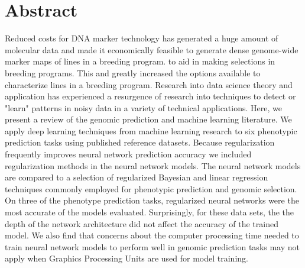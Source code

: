 \chapter*{Abstract}

Reduced costs for DNA marker technology has generated a huge amount of
molecular data and made it economically feasible to generate dense
genome-wide marker maps of lines in a breeding program. to aid in making selections in breeding programs. 
This and greatly increased the options available to characterize lines 
in a breeding program. Research into data science theory and
application has experienced a resurgence of research into 
techniques to detect or "learn" patterns in noisy data in a variety of 
technical applications. Here, we present a review of the genomic prediction 
and machine learning literature. We apply deep learning techniques 
from machine learning research to six phenotypic prediction tasks using 
published reference datasets. Because regularization frequently improves 
neural network prediction accuracy we included regularization methods in the neural network models.
The neural network models are compared to a selection of regularized Bayesian 
and linear regression techniques commonly employed for phenotypic prediction and genomic
selection. On three of the phenotype prediction tasks, regularized neural networks 
were the most accurate of the models evaluated. Surprisingly, for these data sets, the the 
depth of the network architecture did not affect the accuracy of 
the trained model. We also find that concerns about the computer processing 
time needed to train neural network models to perform well in genomic prediction 
tasks may not apply when Graphics Processing Units are used for model training.



